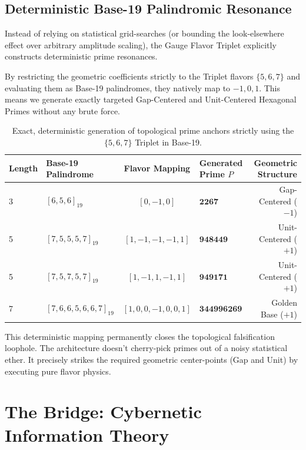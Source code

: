 \subsection{Deterministic Base-19 Palindromic Resonance}

Instead of relying on statistical grid-searches (or bounding the look-elsewhere effect over arbitrary amplitude scaling), the Gauge Flavor Triplet explicitly constructs deterministic prime resonances.

By restricting the geometric coefficients strictly to the Triplet flavors $\{5, 6, 7\}$ and evaluating them as Base-19 palindromes, they natively map to $-1, 0, 1$. This means we generate exactly targeted Gap-Centered and Unit-Centered Hexagonal Primes without any brute force.

\begin{table}[H]
\centering
\begin{tabular}{@{}llclr@{}}
\toprule
\textbf{Length} & \textbf{Base-19 Palindrome} & \textbf{Flavor Mapping} & \textbf{Generated Prime $P$} & \textbf{Geometric Structure} \\
\midrule
3 & $[6, 5, 6]_{19}$ & $[0, -1, 0]$ & $\mathbf{2267}$ & Gap-Centered ($-1$) \\
5 & $[7, 5, 5, 5, 7]_{19}$ & $[1, -1, -1, -1, 1]$ & $\mathbf{948449}$ & Unit-Centered ($+1$) \\
5 & $[7, 5, 7, 5, 7]_{19}$ & $[1, -1, 1, -1, 1]$ & $\mathbf{949171}$ & Unit-Centered ($+1$) \\
7 & $[7, 6, 6, 5, 6, 6, 7]_{19}$ & $[1, 0, 0, -1, 0, 0, 1]$ & $\mathbf{344996269}$ & Golden Base ($+1$) \\
\bottomrule
\end{tabular}
\caption{Exact, deterministic generation of topological prime anchors strictly using the $\{5, 6, 7\}$ Triplet in Base-19.}
\end{table}

This deterministic mapping permanently closes the topological falsification loophole. The architecture doesn't cherry-pick primes out of a noisy statistical ether. It precisely strikes the required geometric center-points (Gap and Unit) by executing pure flavor physics.


\section{The Bridge: Cybernetic Information Theory}

